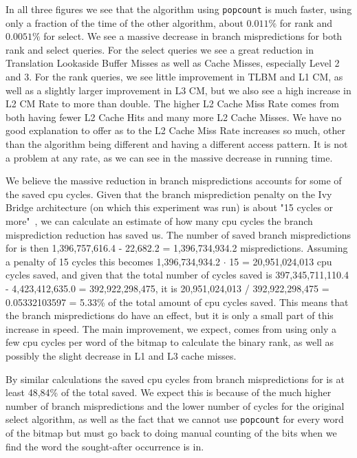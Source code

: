 In all three figures we see that the algorithm using \texttt{popcount} is much faster, using only a fraction of the time of the other algorithm, about $0.011\%$ for rank and $0.0051\%$ for select.
We see a massive decrease in branch mispredictions for both rank and select queries. For the select queries we see a great reduction in Translation Lookaside Buffer Misses as well as Cache Misses, especially Level 2 and 3.
For the rank queries, we see little improvement in TLBM and L1 CM, as well as a slightly larger improvement in L3 CM, but we also see a high increase in L2 CM Rate to more than double.
The higher L2 Cache Miss Rate comes from both having fewer L2 Cache Hits and many more L2 Cache Misses.
We have no good explanation to offer as to the L2 Cache Miss Rate increases so much, other than the algorithm being different and having a different access pattern.
It is not a problem at any rate, as we can see in the massive decrease in running time.

We believe the massive reduction in branch mispredictions accounts for some of the saved cpu cycles.
Given that the branch misprediction penalty on the Ivy Bridge architecture (on which this experiment was run) is about "15 cycles or more"~, we can calculate an estimate of how many cpu cycles the branch misprediction reduction has saved us.
The number of saved branch mispredictions for  is then 1,396,757,616.4 - 22,682.2 = 1,396,734,934.2 mispredictions. Assuming a penalty of 15 cycles this becomes 1,396,734,934.2 $\cdot$ 15 = 20,951,024,013 cpu cycles saved, and given that the total number of cycles saved is 397,345,711,110.4 - 4,423,412,635.0 = 392,922,298,475, it is 20,951,024,013 / 392,922,298,475 = 0.05332103597 = 5.33\% of the total amount of cpu cycles saved.
This means that the branch mispredictions do have an effect, but it is only a small part of this increase in speed. The main improvement, we expect, comes from using only a few cpu cycles per word of the bitmap to calculate the binary rank, as well as possibly the slight decrease in L1 and L3 cache misses.


By similar calculations the saved cpu cycles from branch mispredictions for  is at least 48,84\% of the total saved. We expect this is because of the much higher number of branch mispredictions and the lower number of cycles for the original select algorithm, as well as the fact that we cannot use \texttt{popcount} for every word of the bitmap but must go back to doing manual counting of the bits when we find the word the sought-after occurrence is in.


